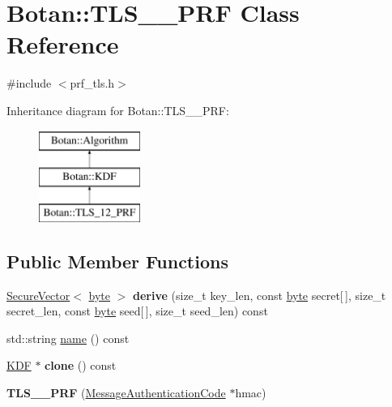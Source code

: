 \hypertarget{classBotan_1_1TLS__12__PRF}{\section{Botan\-:\-:T\-L\-S\-\_\-\_\-\-P\-R\-F Class Reference}
\label{classBotan_1_1TLS__12__PRF}
}


{\ttfamily \#include $<$prf\-\_\-tls.\-h$>$}

Inheritance diagram for Botan\-:\-:T\-L\-S\-\_\-\_\-\-P\-R\-F\-:\begin{figure}[H]
\begin{center}
\leavevmode
\includegraphics[height=3.000000cm]{classBotan_1_1TLS__12__PRF}
\end{center}
\end{figure}
\subsection*{Public Member Functions}
\begin{DoxyCompactItemize}
\item 
\hypertarget{classBotan_1_1TLS__12__PRF_ae0787b05654116648c6878480cac7325}{\hyperlink{classBotan_1_1SecureVector}{Secure\-Vector}$<$ \hyperlink{namespaceBotan_a7d793989d801281df48c6b19616b8b84}{byte} $>$ {\bfseries derive} (size\-\_\-t key\-\_\-len, const \hyperlink{namespaceBotan_a7d793989d801281df48c6b19616b8b84}{byte} secret\mbox{[}$\,$\mbox{]}, size\-\_\-t secret\-\_\-len, const \hyperlink{namespaceBotan_a7d793989d801281df48c6b19616b8b84}{byte} seed\mbox{[}$\,$\mbox{]}, size\-\_\-t seed\-\_\-len) const }\label{classBotan_1_1TLS__12__PRF_ae0787b05654116648c6878480cac7325}

\item 
std\-::string \hyperlink{classBotan_1_1TLS__12__PRF_a8dfba2bf8e304db57873cf7804379ca5}{name} () const 
\item 
\hypertarget{classBotan_1_1TLS__12__PRF_a0b09ae4231775f3da6a2a58e89faa19f}{\hyperlink{classBotan_1_1KDF}{K\-D\-F} $\ast$ {\bfseries clone} () const }\label{classBotan_1_1TLS__12__PRF_a0b09ae4231775f3da6a2a58e89faa19f}

\item 
\hypertarget{classBotan_1_1TLS__12__PRF_ac54d5eb8bfb62fa51dce16dc10f600b2}{{\bfseries T\-L\-S\-\_\-\_\-\-P\-R\-F} (\hyperlink{classBotan_1_1MessageAuthenticationCode}{Message\-Authentication\-Code} $\ast$hmac)}\label{classBotan_1_1TLS__12__PRF_ac54d5eb8bfb62fa51dce16dc10f600b2}

\end{DoxyCompactItemize}


